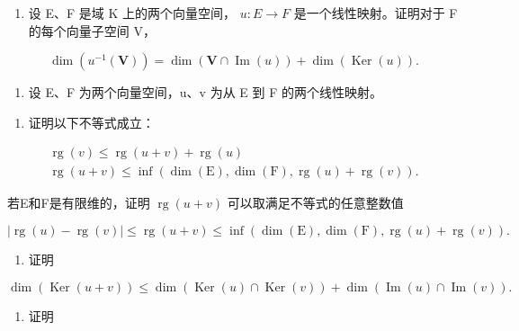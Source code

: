 \begin{enumerate}
\def\labelenumi{\arabic{enumi}.}
\setcounter{enumi}{10}
\tightlist
\item
  设 E、F 是域 K 上的两个向量空间， \(u: E \rightarrow F\) 是一个线性映射。证明对于 F 的每个向量子空间 V，
\end{enumerate}

\[
\dim (u ^ {- 1} (\mathbf {V})) = \dim (\mathbf {V} \cap \operatorname{Im} (u)) + \dim (\operatorname{Ker} (u)).
\]

\begin{enumerate}
\def\labelenumi{\arabic{enumi}.}
\setcounter{enumi}{11}
\tightlist
\item
  设 E、F 为两个向量空间，u、v 为从 E 到 F 的两个线性映射。
\end{enumerate}

\begin{enumerate}
\def\labelenumi{(\alph{enumi})}
\tightlist
\item
  证明以下不等式成立：
\end{enumerate}

\[
\begin{array}{c} \operatorname{rg} (v) \leqslant \operatorname{rg} (u + v) + \operatorname{rg} (u) \\ \operatorname{rg} (u + v) \leqslant \inf (\dim (\mathrm{E}), \dim (\mathrm{F}), \operatorname{rg} (u) + \operatorname{rg} (v)). \end{array}
\]

若E和F是有限维的，证明 \(\operatorname{rg}(u + v)\) 可以取满足不等式的任意整数值

\[
\left| \operatorname{rg} (u) - \operatorname{rg} (v) \right| \leqslant \operatorname{rg} (u + v) \leqslant \inf (\dim (\mathrm{E}), \dim (\mathrm{F}), \operatorname{rg} (u) + \operatorname{rg} (v)).
\]

\begin{enumerate}
\def\labelenumi{(\alph{enumi})}
\setcounter{enumi}{1}
\tightlist
\item
  证明
\end{enumerate}

\[
\dim (\operatorname{Ker} (u + v)) \leqslant \dim (\operatorname{Ker} (u) \cap \operatorname{Ker} (v)) + \dim (\operatorname{Im} (u) \cap \operatorname{Im} (v)).
\]

\begin{enumerate}
\def\labelenumi{(\alph{enumi})}
\setcounter{enumi}{2}
\tightlist
\item
  证明
\end{enumerate}

